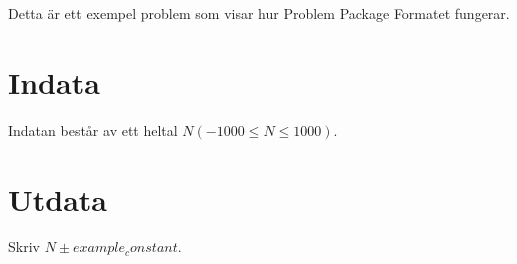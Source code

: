Detta är ett exempel problem som visar hur Problem Package Formatet fungerar.
\section*{Indata}
Indatan består av ett heltal $N (-1000 \le N \le 1000)$.
\section*{Utdata}
Skriv $N \pm {{example_constant}}$.
